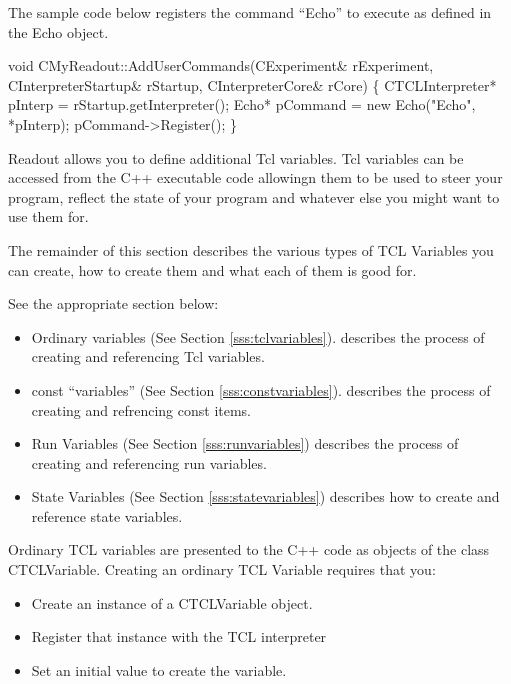       The sample code below registers the command ``Echo''
      to execute as defined in the Echo object.
      \begin{example}
      
      void 
      CMyReadout::AddUserCommands(CExperiment\& rExperiment,
				  CInterpreterStartup\& rStartup,
				  CInterpreterCore\& rCore)
      \{
	 CTCLInterpreter* pInterp = rStartup.getInterpreter();
	 Echo* pCommand = new Echo("Echo", *pInterp);
	 pCommand->Register();
      \}
      
      \end{example}
      
      Readout allows you to define additional Tcl variables.
      Tcl variables can be accessed from the C++ executable
      code allowingn them to be used to steer your program,
      reflect the state of your program and whatever else you
      might want to use them for.
      
      The remainder of this section describes the various 
      types of TCL Variables you can create, how to create them 
      and what each of them is good for.
      
      \begin{iftex}
	 See the appropriate section below:
	 
	 \begin{itemize}
	    \item Ordinary variables (See Section \ref{sss:tclvariables}).
	       describes the process of creating and 
	       referencing Tcl variables.
	    \item const ``variables'' (See Section \ref{sss:constvariables}).
	       describes the process of creating and 
	       refrencing const items.  
	    \item Run Variables (See Section \ref{sss:runvariables})
	       describes the process of creating and referencing
	       run variables.
	    \item State Variables (See Section \ref{sss:statevariables})
	       describes how to create and reference state
	       variables.
	 \end{itemize}
     \end{iftex}
      
	 Ordinary TCL variables are presented to the C++
	 code as objects of the class CTCLVariable.  
	 Creating an ordinary TCL Variable requires that you:
	 \begin{itemize}
	    \item Create an instance of a CTCLVariable object.
	    \item Register that instance with the TCL interpreter
	    \item Set an initial value to create the variable.
	 \end{itemize}
	 
